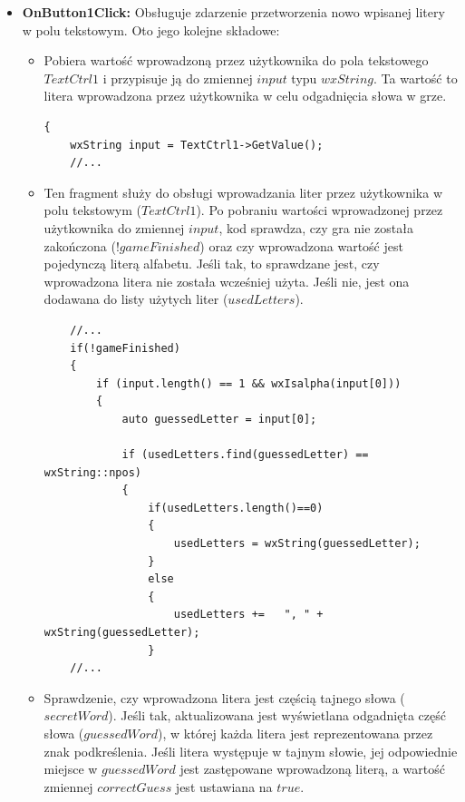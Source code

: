 \documentclass[]{report}
\begin{document}
\begin{itemize}
\begin{itemize}
		\end{itemize}
		\item \textbf{OnButton1Click:} Obsługuje zdarzenie przetworzenia nowo wpisanej litery w polu tekstowym. Oto jego kolejne składowe:
		\begin{itemize}
			\item Pobiera wartość wprowadzoną przez użytkownika do pola tekstowego $TextCtrl1$ i przypisuje ją do zmiennej $input$ typu $wxString$. Ta wartość to litera wprowadzona przez użytkownika w celu odgadnięcia słowa w grze.
			\begin{lstlisting}
{
	wxString input = TextCtrl1->GetValue();
	//...
			\end{lstlisting}
			\newpage
			\item Ten fragment służy do obsługi wprowadzania liter przez użytkownika w polu tekstowym ($TextCtrl1$). Po pobraniu wartości wprowadzonej przez użytkownika do zmiennej $input$, kod sprawdza, czy gra nie została zakończona ($!gameFinished$) oraz czy wprowadzona wartość jest pojedynczą literą alfabetu. Jeśli tak, to sprawdzane jest, czy wprowadzona litera nie została wcześniej użyta. Jeśli nie, jest ona dodawana do listy użytych liter ($usedLetters$).
			\begin{lstlisting}
	//...
	if(!gameFinished)
	{
		if (input.length() == 1 && wxIsalpha(input[0]))
		{
			auto guessedLetter = input[0];
			
			if (usedLetters.find(guessedLetter) == wxString::npos)
			{
				if(usedLetters.length()==0)
				{
					usedLetters = wxString(guessedLetter);
				}
				else
				{
					usedLetters +=   ", " + wxString(guessedLetter);
				}
	//...
			\end{lstlisting}
			\item Sprawdzenie, czy wprowadzona litera jest częścią tajnego słowa ($secretWord$). Jeśli tak, aktualizowana jest wyświetlana odgadnięta część słowa ($guessedWord$), w której każda litera jest reprezentowana przez znak podkreślenia. Jeśli litera występuje w tajnym słowie, jej odpowiednie miejsce w $guessedWord$ jest zastępowane wprowadzoną literą, a wartość zmiennej $correctGuess$ jest ustawiana na $true$.
			

\end{itemize}
\end{itemize}
\end{document}
